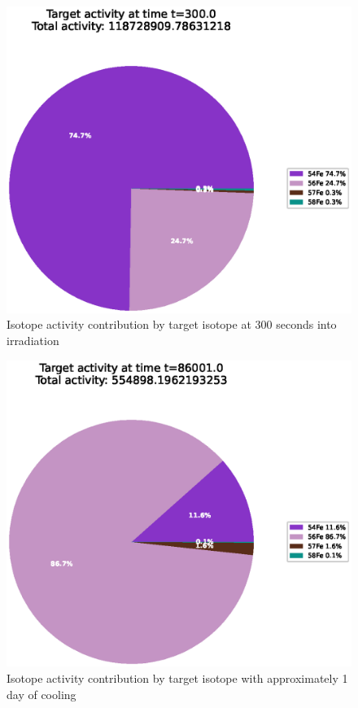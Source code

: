 \begin{figure}[!htb]
\centering
\includegraphics[width=0.8\linewidth]{chapters/activity_code/fe-activity-v2/target-activity/0100_300.eps}
\caption{Isotope activity contribution by target isotope at 300 seconds into irradiation}
\label{fig:activity-v2-target-activity-300s}
\end{figure}

\begin{figure}[!htb]
\centering
\includegraphics[width=0.8\linewidth]{chapters/activity_code/fe-activity-v2/target-activity/0166_86001.eps}
\caption{Isotope activity contribution by target isotope with approximately 1 day of cooling}
\label{fig:activity-v2-target-activity-86001s}
\end{figure}


